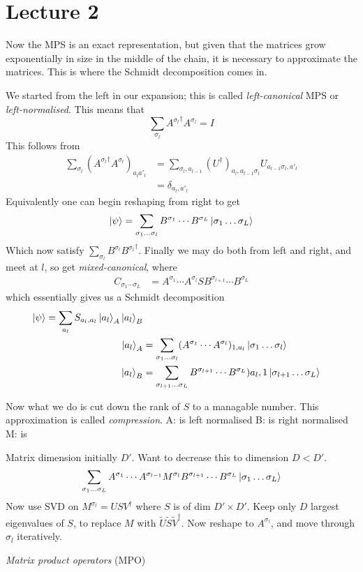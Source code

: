 \documentclass[a4paper]{article}
\begin{document}
\section{Lecture 2}
Now the MPS is an exact representation, but given that the matrices grow
exponentially in size in the middle of the chain, it is necessary to approximate
the matrices. This is where the Schmidt decomposition comes in.
\begin{remark}
    We started from the left in our expansion; this is called
    \emph{left-canonical} MPS or \emph{left-normalised}. This means that 
    \[
        \sum_{\sigma_l} {A^{\sigma_l}}^\dagger A^{\sigma_l} =I
    \]
    This follows from 
    \begin{align*}
        \sum_{\sigma_l} \left({A^{\sigma_l}}^\dagger A^{\sigma_l}\right)_{a_l a'_l}
        &=\sum_{\sigma_l, a_{l-1}} (U^\dagger)_{a_l,a_{l-1}\sigma_l}
            U_{a_{l-1}\sigma_l, a'_l}\\
        &=\delta_{a_l,a'_l}
    \end{align*}
    Equivalently one can begin reshaping from right to get 
    \[
        \ket{\psi}=\sum_{\sigma_1\dots\sigma_l} B^{\sigma_1}\cdots
        B^{\sigma_L}\ket{\sigma_1\dots\sigma_L}
    \]
Which now satisfy $\sum_{\sigma_l} B^{\sigma_l} {B^{\sigma_l}}^\dagger$.
Finally we may do both from left and right, and meet at $l$, so get
\emph{mixed-canonical}, where 
\begin{align*}
    C_{\sigma_1\cdots \sigma_L}&= A^{\sigma_1}\cdots A^{\sigma_l}
    S B^{\sigma_{l+1}}\cdots B^{\sigma_L}
\end{align*}
which essentially gives us a Schmidt decomposition
\begin{align*}
    \ket{\psi}=  \sum_{a_l} S_{a_l,a_l} \ket{a_l}_A\ket{a_l}_B\\
    \ket{a_l}_A&=\sum_{\sigma_1\dots\sigma_l}(A^{\sigma_1}\cdots
    A^{\sigma_l})_{1,a_l}\ket{\sigma_1\dots\sigma_l}\\
    \ket{a_l}_B&= \sum_{\sigma_{l+1}\dots\sigma_L} B^{\sigma_{l+1}}\cdots
    B^{\sigma_L}){a_l,1}\ket{\sigma_{l+1}\dots \sigma_L}
\end{align*}
\end{remark}
Now what we do is cut down the rank of $S$ to a managable number. This
approximation is called \emph{compression}.
A:  is left normalised
B: is right normalised
M: is 

\begin{method}
    Matrix dimension initially $D'$.
    Want to decrease this to dimension $D<D'$.
    \begin{align*}
        \sum_{\sigma_1\dots\sigma_L} A^{\sigma_1}\cdots A^{\sigma_{l-1}}
        M^{\sigma_l} B^{\sigma_{l+1}}\cdots
        B^{\sigma_L}\ket{\sigma_1\dots\sigma_L}
    \end{align*}
    Now use SVD on $M^{\sigma_l}= USV^{\dagger}$ where $S$ is of dim $D'\times
    D'$. Keep only $D$ largest eigenvalues of $S$, to replace $M$ with
    $\tilde{U}\tilde{S}\tilde{V}^\dagger$. Now reshape to $A^{\sigma_l}$, and
    move through $\sigma_l$ iteratively.
\end{method}
\emph{Matrix product operators} (MPO)
\end{document}
